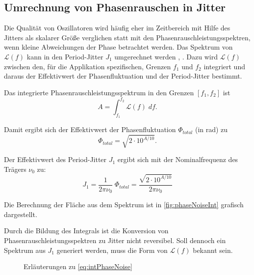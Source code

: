 \subsection{Umrechnung von Phasenrauschen in Jitter}
Die Qualität von Oszillatoren wird häufig eher im Zeitbereich mit Hilfe des Jitters als skalarer Größe verglichen statt mit den Phasenrauschleistungsspektren, wenn kleine Abweichungen der Phase betrachtet werden. Das Spektrum von $\mathscr{L}(f)$ kann in den Period-Jitter $J_1$ umgerechnet werden \cite{Kester2008}, \cite{Maxim2004}. Dazu wird $\mathscr{L}(f)$ zwischen den, für die Applikation spezifischen, Grenzen $f_1$ und $f_2$ integriert und daraus der Effektivwert der Phasenfluktuation und der Period-Jitter bestimmt.

Das integrierte Phasenrauschleistungsspektrum in den Grenzen $[f_1, f_2]$ ist
\begin{equation}
\label{eq:intPhaseNoise}
	A = \int_{f_1}^{f_2} \mathscr{L}(f) \; df.
\end{equation}

Damit ergibt sich der Effektivwert der Phasenfluktuation $\Phi_{total}$ (in rad) zu
\begin{equation}
	\Phi_{total} = \sqrt{2 \cdot 10^{A/10}}.
\end{equation}

Der Effektivwert des Period-Jitter $J_1$ ergibt sich mit der Nominalfrequenz des Trägers $\nu_0$ zu:
\begin{equation}
	J_1 = \frac{1}{2 \pi \nu_0} \; \Phi_{total} = \frac{\sqrt{2 \cdot 10^{A/10}}}{2 \pi \nu_0}
\end{equation}

Die Berechnung der Fläche aus dem Spektrum ist in \autoref{fig:phaseNoiseInt} grafisch dargestellt.

Durch die Bildung des Integrals ist die Konversion von Phasenrauschleistungsspektren zu Jitter nicht reversibel. Soll dennoch ein Spektrum aus $J_1$ generiert werden, muss die Form von $\mathscr{L}(f)$ bekannt sein. 

\begin{figure}[H]
	\centering
	\caption[Umrechnung Phasenrauschen zu Jitter]{Erläuterungen zu \autoref{eq:intPhaseNoise}}
	\label{fig:phaseNoiseInt}
\end{figure}

